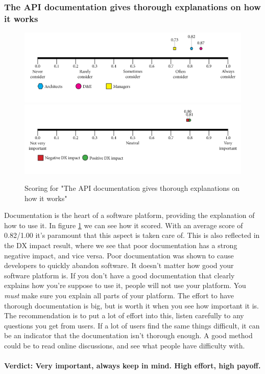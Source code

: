 \documentclass{article}
\begin{document}
\subsubsection{The API documentation gives thorough explanations on how it works}
\begin{figure}[H]
\centering
\includegraphics[width=\linewidth]{scorelines/aspect3.png}
\includegraphics[width=\linewidth]{dxscorelines/dxaspect3.png}
\caption{Scoring for "The API documentation gives thorough explanations on how it works"}
\label{fig:aspect3}
\end{figure}
Documentation is the heart of a software platform, providing the explanation of how to use it. In figure \ref{fig:aspect3} we can see how it scored. With an average score of 0.82/1.00 it's paramount that this aspect is taken care of. This is also reflected in the DX impact result, where we see that poor documentation has a strong negative impact, and vice versa. Poor documentation was shown to cause developers to quickly abandon software. It doesn't matter how good your software platform is. If you don't have a good documentation that clearly explains how you're suppose to use it, people will not use your platform. You \textit{must} make sure you explain all parts of your platform. The effort to have thorough documentation is big, but is worth it when you see how important it is. The recommendation is to put a lot of effort into this, listen carefully to any questions you get from users. If a lot of users find the same things difficult, it can be an indicator that the documentation isn't thorough enough. A good method could be to read online discussions, and see what people have difficulty with.\\ \\
\textbf{Verdict: Very important, always keep in mind. High effort, high payoff.}
\end{document}
